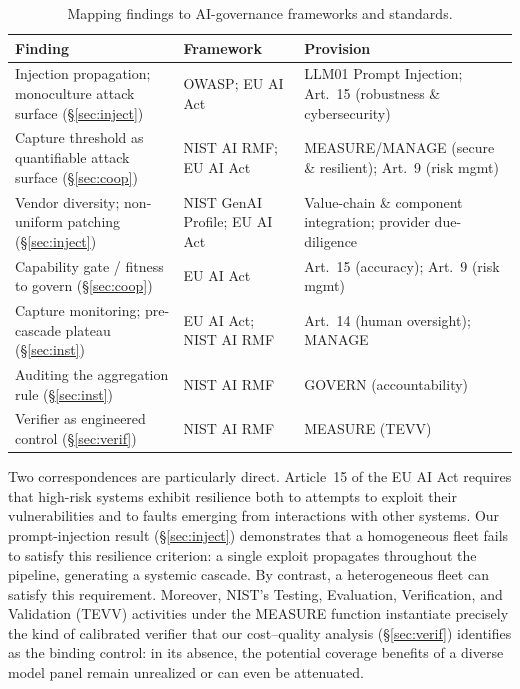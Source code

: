\documentclass[manuscript,screen,review]{acmart}
\begin{document}
\begin{table}[t]
\caption{Mapping findings to AI-governance frameworks and standards.}
\label{tab:policy}
\small
\begin{tabular}{@{}p{2.7cm}p{2.0cm}p{2.4cm}@{}}
\toprule
\textbf{Finding} & \textbf{Framework} & \textbf{Provision} \\
\midrule
Injection propagation; monoculture attack surface (\S\ref{sec:inject}) & OWASP; EU AI Act & LLM01 Prompt Injection; Art.~15 (robustness \& cybersecurity) \\
Capture threshold as quantifiable attack surface (\S\ref{sec:coop}) & NIST AI RMF; EU AI Act & MEASURE/MANAGE (secure \& resilient); Art.~9 (risk mgmt) \\
Vendor diversity; non-uniform patching (\S\ref{sec:inject}) & NIST GenAI Profile; EU AI Act & Value-chain \& component integration; provider due-diligence \\
Capability gate / fitness to govern (\S\ref{sec:coop}) & EU AI Act & Art.~15 (accuracy); Art.~9 (risk mgmt) \\
Capture monitoring; pre-cascade plateau (\S\ref{sec:inst}) & EU AI Act; NIST AI RMF & Art.~14 (human oversight); MANAGE \\
Auditing the aggregation rule (\S\ref{sec:inst}) & NIST AI RMF & GOVERN (accountability) \\
Verifier as engineered control (\S\ref{sec:verif}) & NIST AI RMF & MEASURE (TEVV) \\
\bottomrule
\end{tabular}
\end{table}

Two correspondences are particularly direct. Article~15 of the EU AI Act requires that high-risk systems exhibit resilience both to attempts to exploit their vulnerabilities and to faults emerging from interactions with other systems. Our prompt-injection result (\S\ref{sec:inject}) demonstrates that a homogeneous fleet fails to satisfy this resilience criterion: a single exploit propagates throughout the pipeline, generating a systemic cascade. By contrast, a heterogeneous fleet can satisfy this requirement. Moreover, NIST’s Testing, Evaluation, Verification, and Validation (TEVV) activities under the MEASURE function instantiate precisely the kind of calibrated verifier that our cost–quality analysis (\S\ref{sec:verif}) identifies as the binding control: in its absence, the potential coverage benefits of a diverse model panel remain unrealized or can even be attenuated.
\end{document}
